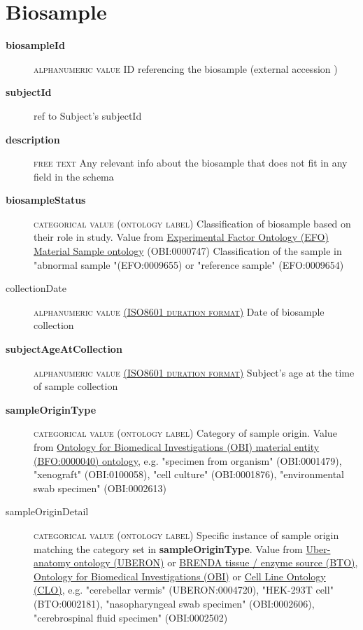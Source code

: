\documentclass[a4paper, 10pt]{article}        %
\begin{document}
  
  \section*{ {\color{teal} Biosample}}
  
  \begin{description}
	\item[\textbf{biosampleId}]  {\textsc{alphanumeric value}} ID referencing the biosample (external accession )
	\item[\textbf{subjectId}] ref to Subject's subjectId
	\item[\textbf{description}]  {\textsc{free text}} Any relevant info about the biosample that does not fit in any field in the schema
	\item[\textbf{biosampleStatus}] {\textsc{categorical value (ontology label)}} Classification of biosample based on their role in study. Value from  \href{https://www.ebi.ac.uk/ols/ontologies/efo/terms?iri=http%3A%2F%2Fpurl.obolibrary.org%2Fobo%2FOBI_0000747&viewMode=All&siblings=false}{Experimental Factor Ontology (EFO) Material Sample ontology} (OBI:0000747) Classification of the sample in "abnormal sample "(EFO:0009655) or "reference sample" (EFO:0009654)
	\item[collectionDate] {\textsc{alphanumeric value \href{https://www.iso.org/iso-8601-date-and-time-format.html}{(ISO8601 duration format)}}} Date of biosample collection
	\item[\textbf{subjectAgeAtCollection}] {\textsc{alphanumeric value \href{https://www.iso.org/iso-8601-date-and-time-format.html}{(ISO8601 duration format)}}} Subject's age at  the time of sample collection
	\item[\textbf{sampleOriginType}] {\textsc{categorical value (ontology label)}} Category of sample origin. Value from \href{http://purl.obolibrary.org/obo/BFO_0000040}{Ontology for Biomedical Investigations (OBI) material entity (BFO:0000040) ontology}, e.g. "specimen from organism" (OBI:0001479), "xenograft" (OBI:0100058), "cell culture" (OBI:0001876), "environmental swab specimen" (OBI:0002613)
	\item[sampleOriginDetail] {\textsc{categorical value (ontology label)}} Specific instance of sample origin matching the category set in \textbf{sampleOriginType}. Value from \href{https://www.ebi.ac.uk/ols/ontologies/uberon}{Uber-anatomy ontology (UBERON)} or \href{https://www.ebi.ac.uk/ols/ontologies/bto}{BRENDA tissue / enzyme source (BTO)}, \href{http://purl.obolibrary.org/obo/BFO_0000040}{Ontology for Biomedical Investigations (OBI)} or \href{www.ebi.ac.uk/ols/ontologies/clo}{Cell Line Ontology (CLO)}, e.g. "cerebellar vermis" (UBERON:0004720), "HEK-293T cell" (BTO:0002181), "nasopharyngeal swab specimen" (OBI:0002606), "cerebrospinal fluid specimen" (OBI:0002502)

\end{description}
\end{document}
